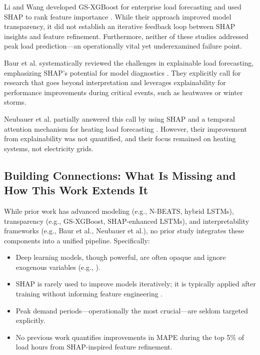 \documentclass{ifacconf}
\begin{document}
Li and Wang developed GS-XGBoost for enterprise load forecasting and used SHAP to rank feature importance \cite{Li2022PowerLF}. While their approach improved model transparency, it did not establish an iterative feedback loop between SHAP insights and feature refinement. Furthermore, neither of these studies addressed peak load prediction—an operationally vital yet underexamined failure point.

Baur et al. systematically reviewed the challenges in explainable load forecasting, emphasizing SHAP’s potential for model diagnostics \cite{baur2024explainability}. They explicitly call for research that goes beyond interpretation and leverages explainability for performance improvements during critical events, such as heatwaves or winter storms.

Neubauer et al. partially answered this call by using SHAP and a temporal attention mechanism for heating load forecasting \cite{neubauer2025explainableb}. However, their improvement from explainability was not quantified, and their focus remained on heating systems, not electricity grids.

\subsection{Building Connections: What Is Missing and How This Work Extends It}

While prior work has advanced modeling (e.g., N-BEATS, hybrid LSTMs), transparency (e.g., GS-XGBoost, SHAP-enhanced LSTMs), and interpretability frameworks (e.g., Baur et al., Neubauer et al.), no prior study integrates these components into a unified pipeline. Specifically:

\begin{itemize}
    \item Deep learning models, though powerful, are often opaque and ignore exogenous variables (e.g., \cite{Oreshkin2020NBEATSNN, Kasprzyk2024EnhancedNF}).
    \item SHAP is rarely used to improve models iteratively; it is typically applied after training without informing feature engineering \cite{Li2022PowerLF, Wu2022AnEF}.
    \item Peak demand periods—operationally the most crucial—are seldom targeted explicitly.
    \item No previous work quantifies improvements in MAPE during the top 5\% of load hours from SHAP-inspired feature refinement.
\end{itemize}
\end{document}
